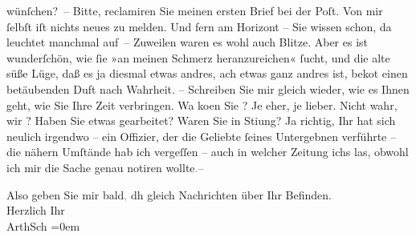                wünſchen? – Bitte, reclamiren Sie meinen ersten Brief bei der Poſt. Von mir{ }ſelbſt
               iſt nichts neues zu melden. Und fern am Horizont – Sie wissen schon, da leuchtet {\pb}\label{K_L02951-2v}\label{K_L02951-2} manchmal
                  auf{\dotstwo} – Zuweilen waren es wohl auch Blitze. Aber es ist
               wunderſchön, wie{ }ſie »an meinen Schmerz heranzureichen«{ }ſucht, und die alte süße
               Lüge, daß es ja diesmal etwas andres, ach etwas ganz andres ist, beko{\geminationm}t {\pb}einen
               betäubenden Duft nach Wahrheit. – Schreiben Sie mir gleich wieder, wie es Ihnen geht,
               wie Sie Ihre Zeit verbringen. Wa{\geminationn} ko{\geminationm}en Sie \label{K_L02951-3v}\label{K_L02951-3}? Je eher, je lieber. Nicht wahr, wir \label{K_L02951-4v}\label{K_L02951-4}? Haben {\pb}Sie etwas gearbeitet? Waren Sie in Sti{\geminationm}ung? Ja richtig, Ihr \label{K_L02951-5v}\label{K_L02951-5} hat sich neulich
               irgendwo \label{K_L02951-6v}\label{K_L02951-6} – ein
               Offizier, der die Geliebte{ }ſeines Untergebnen verführte – die nähern Umſtände hab ich
               vergeſſen – auch {\pb}in welcher Zeitung ichs
               las, obwohl ich mir die Sache genau notiren wollte\textcolor{gray}{.}–\pend
           
\pstart
           Also geben Sie mir bald\textcolor{gray}{,} dh gleich Nachrichten über Ihr
               Befinden. {\\[\baselineskip]}Herzlich Ihr {\\[\baselineskip]}\spacefill\mbox{ArthSch}\pend
           \leftskip=0em{}\endnumbering{}  \newcommand{\dateiname}{L02951}\newcommand{\titel}{Arthur Schnitzler an Felix Salten, [10.? 9. 1891]}\newcommand{\editorInnen}{Martin Anton Müller und Laura Untner}
